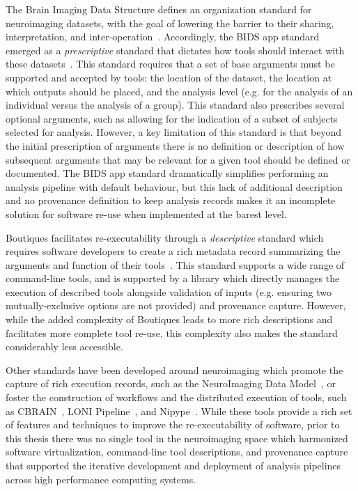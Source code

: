 The Brain Imaging Data Structure defines an organization standard for neuroimaging datasets, with the goal of lowering
the barrier to their sharing, interpretation, and inter-operation~\cite{gorgolewski2016brain}. Accordingly, the BIDS
app standard emerged as a \textit{prescriptive} standard that dictates how tools should interact with these
datasets~\cite{gorgolewski2017bids}. This standard requires that a set of base arguments must be supported and accepted
by tools: the location of the dataset, the location at which outputs should be placed, and the analysis level (e.g.
for the analysis of an individual versus the analysis of a group). This standard also prescribes several optional
arguments, such as allowing for the indication of a subset of subjects selected for analysis. However, a key limitation
of this standard is that beyond the initial prescription of arguments there is no definition or description of how
subsequent arguments that may be relevant for a given tool should be defined or documented. The BIDS app standard
dramatically simplifies performing an analysis pipeline with default behaviour, but this lack of additional description
and no provenance definition to keep analysis records makes it an incomplete solution for software re-use when
implemented at the barest level.

Boutiques facilitates re-executability through a \textit{descriptive} standard which requires software developers to
create a rich metadata record summarizing the arguments and function of their tools~\cite{Glatard2018-tu}. This standard
supports a wide range of command-line tools, and is supported by a library which directly manages the execution of
described tools alongside validation of inputs (e.g. ensuring two mutually-exclusive options are not provided) and
provenance capture. However, while the added complexity of Boutiques leads to more rich descriptions and facilitates
more complete tool re-use, this complexity also makes the standard considerably less accessible.

Other standards have been developed around neuroimaging which promote the capture of rich execution records, such as
the NeuroImaging Data Model~\cite{maumet2016sharing}, or foster the construction of workflows and the distributed
execution of tools, such as CBRAIN~\cite{maumet2016sharing}, LONI Pipeline~\cite{rex2003loni}, and
Nipype~\cite{gorgolewski2011nipype}. While these tools provide a rich set of features and techniques to improve the
re-executability of software, prior to this thesis there was no single tool in the neuroimaging space which harmonized
software virtualization, command-line tool descriptions, and provenance capture that supported the iterative
development and deployment of analysis pipelines across high performance computing systems.

